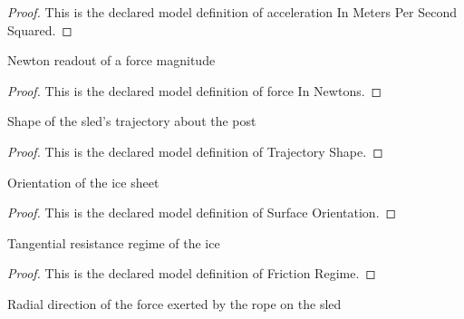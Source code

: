 \begin{proof}
  This is the declared model definition of acceleration In Meters Per Second Squared.
\end{proof}
\begin{definition}
  \label{def:physics:phyx-mini-0806:phyxminiproblems-problemphyxmini0806-forceinnewtons}
  Newton readout of a force magnitude
\end{definition}
\begin{proof}
  This is the declared model definition of force In Newtons.
\end{proof}
\begin{definition}
  \label{def:physics:phyx-mini-0806:phyxminiproblems-problemphyxmini0806-trajectoryshape}
  Shape of the sled's trajectory about the post
\end{definition}
\begin{proof}
  This is the declared model definition of Trajectory Shape.
\end{proof}
\begin{definition}
  \label{def:physics:phyx-mini-0806:phyxminiproblems-problemphyxmini0806-surfaceorientation}
  Orientation of the ice sheet
\end{definition}
\begin{proof}
  This is the declared model definition of Surface Orientation.
\end{proof}
\begin{definition}
  \label{def:physics:phyx-mini-0806:phyxminiproblems-problemphyxmini0806-frictionregime}
  Tangential resistance regime of the ice
\end{definition}
\begin{proof}
  This is the declared model definition of Friction Regime.
\end{proof}
\begin{definition}
  \label{def:physics:phyx-mini-0806:phyxminiproblems-problemphyxmini0806-radialdirection}
  Radial direction of the force exerted by the rope on the sled
\end{definition}
